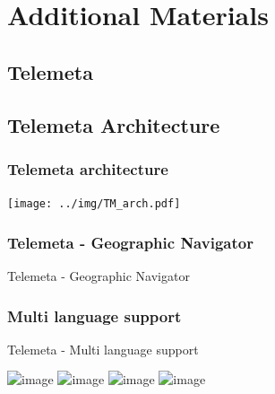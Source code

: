\documentclass[final, hyperref, table]{beamer}
\begin{document}
\appendix
\section{Additional Materials}
\subsection{Telemeta}
\subsection{Telemeta Architecture}
\begin{frame}\frametitle{Telemeta architecture}
  \begin{center}
    \texttt{[image: ../img/TM\_arch.pdf]}
  \end{center}
\end{frame}
\subsubsection{Telemeta - Geographic Navigator}
\begin{frame}[plain, label=geonavigator]{Telemeta - Geographic Navigator}
  \begin{center}
  \end{center}
\hyperlink{telemeta_features}{}
\end{frame}
\subsubsection{Multi language support}
\begin{frame}[label=telemeta_languages]{Telemeta - Multi language support}

  \begin{center}
    \includegraphics<1>[width=1.1\textwidth]{telemeta_english.png}
    \includegraphics<2>[width=1.1\textwidth]{telemeta_french.png}
    \includegraphics<3>[width=1.1\textwidth]{telemeta_german.png}
    \includegraphics<4>[width=1.1\textwidth]{telemeta_chinese.png}
  \end{center}
\hyperlink{telemeta_features}{}
\end{frame}
\end{document}
